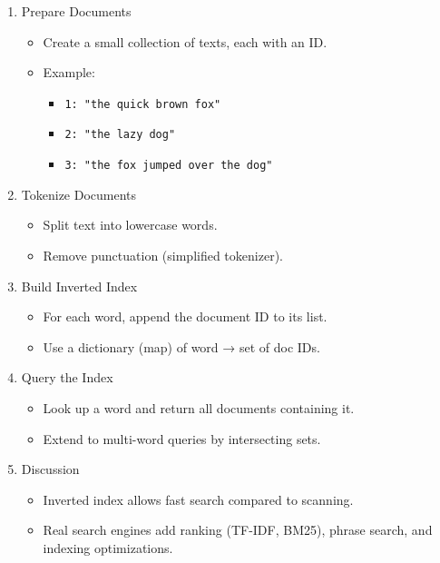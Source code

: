 \documentclass[
  letterpaper,
  DIV=11,
  numbers=noendperiod]{scrreprt}
\providecommand{\tightlist}{%
  \setlength{\itemsep}{0pt}\setlength{\parskip}{0pt}}
\begin{document}
\begin{enumerate}
\def\labelenumi{\arabic{enumi}.}
\item
  Prepare Documents

  \begin{itemize}
  \item
    Create a small collection of texts, each with an ID.
  \item
    Example:

    \begin{itemize}
    \tightlist
    \item
      \texttt{1:\ "the\ quick\ brown\ fox"}
    \item
      \texttt{2:\ "the\ lazy\ dog"}
    \item
      \texttt{3:\ "the\ fox\ jumped\ over\ the\ dog"}
    \end{itemize}
  \end{itemize}
\item
  Tokenize Documents

  \begin{itemize}
  \tightlist
  \item
    Split text into lowercase words.
  \item
    Remove punctuation (simplified tokenizer).
  \end{itemize}
\item
  Build Inverted Index

  \begin{itemize}
  \tightlist
  \item
    For each word, append the document ID to its list.
  \item
    Use a dictionary (map) of word → set of doc IDs.
  \end{itemize}
\item
  Query the Index

  \begin{itemize}
  \tightlist
  \item
    Look up a word and return all documents containing it.
  \item
    Extend to multi-word queries by intersecting sets.
  \end{itemize}
\item
  Discussion

  \begin{itemize}
  \tightlist
  \item
    Inverted index allows fast search compared to scanning.
  \item
    Real search engines add ranking (TF-IDF, BM25), phrase search, and
    indexing optimizations.
  \end{itemize}
\end{enumerate}
\end{document}
